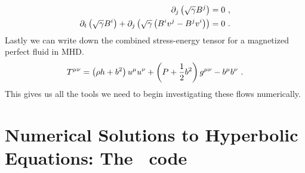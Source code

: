     \begin{align}
    	\partial_j \left( \sqrt{\gam} B^j \right) &= 0 \ , \eqlabel{divB}\\
	\partial_t \left( \sqrt{\gam} B^i \right) + \partial_j \left(\sqrt{\gam}\left(B^i v^j - B^j v^i\right)\right) &= 0\ . \eqlabel{induction}
    \end{align}
    Lastly we can write down the combined stress-energy tensor for a magnetized perfect fluid in MHD.
    \begin{equation}
    	T^{\mu\nu} = \left(\rho h + b^2\right) u^\mu u^\nu + \left(P + \frac{1}{2}b^2\right)g^{\mu\nu} - b^\mu b^\nu \ . \eqlabel{TmunuGRMHD}
    \end{equation}
    This gives us all the tools we need to begin investigating these flows numerically.

\section{Numerical Solutions to Hyperbolic Equations: The \grdisco\ code}

